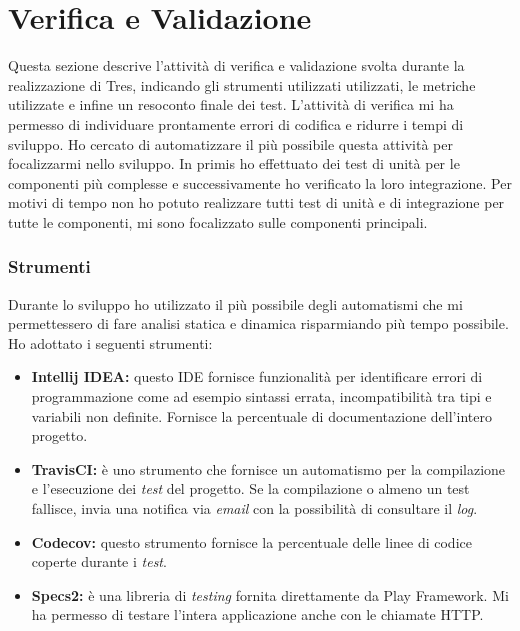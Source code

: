 \section{Verifica e Validazione}
Questa sezione descrive l'attività di verifica e validazione svolta durante la realizzazione di Tres, indicando gli strumenti utilizzati utilizzati, le metriche utilizzate e infine un resoconto finale dei test. L'attività di verifica mi ha permesso di individuare prontamente errori di codifica e ridurre i tempi di sviluppo. Ho cercato di automatizzare il più possibile questa attività per focalizzarmi nello sviluppo. In primis ho effettuato dei test di unità per le componenti più complesse e successivamente ho verificato la loro integrazione. Per motivi di tempo non ho potuto realizzare tutti test di unità e di integrazione per tutte le componenti, mi sono focalizzato sulle componenti principali. 
\subsubsection{Strumenti}
Durante lo sviluppo ho utilizzato il più possibile degli automatismi che mi permettessero di fare analisi statica e dinamica risparmiando più tempo possibile. Ho adottato i seguenti strumenti:
\begin{itemize}
\item \textbf{Intellij IDEA:} questo IDE fornisce funzionalità per identificare errori di programmazione come ad esempio sintassi errata, incompatibilità tra tipi e variabili non definite. Fornisce la percentuale di documentazione dell'intero progetto.
\item \textbf{TravisCI:} è uno strumento che fornisce un automatismo per la compilazione e l'esecuzione dei \emph{test} del progetto. Se la compilazione o almeno un test fallisce, invia una notifica via \emph{email} con la possibilità di consultare il \emph{log}.
\item \textbf{Codecov:} questo strumento fornisce la percentuale delle linee di codice coperte durante i \emph{test}.
\item \textbf{Specs2:} è una libreria di \emph{testing} fornita direttamente da Play Framework. Mi ha permesso di testare l'intera applicazione anche con le chiamate HTTP.
\end{itemize}
